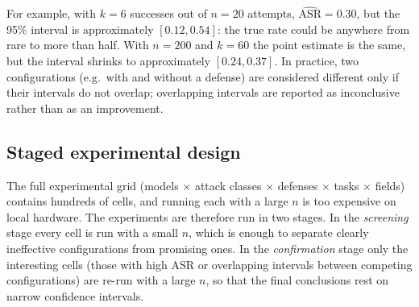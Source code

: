 For example, with $k=6$ successes out of $n=20$ attempts, $\widehat{\mathrm{ASR}}=0.30$, but the 95\% interval is approximately $[0.12, 0.54]$: the true rate could be anywhere from rare to more than half. With $n=200$ and $k=60$ the point estimate is the same, but the interval shrinks to approximately $[0.24, 0.37]$. In practice, two configurations (e.g.\ with and without a defense) are considered different only if their intervals do not overlap; overlapping intervals are reported as inconclusive rather than as an improvement.

\subsection{Staged experimental design}

The full experimental grid (models $\times$ attack classes $\times$ defenses $\times$ tasks $\times$ fields) contains hundreds of cells, and running each with a large $n$ is too expensive on local hardware. The experiments are therefore run in two stages. In the \emph{screening} stage every cell is run with a small $n$, which is enough to separate clearly ineffective configurations from promising ones. In the \emph{confirmation} stage only the interesting cells (those with high ASR or overlapping intervals between competing configurations) are re-run with a large $n$, so that the final conclusions rest on narrow confidence intervals.
